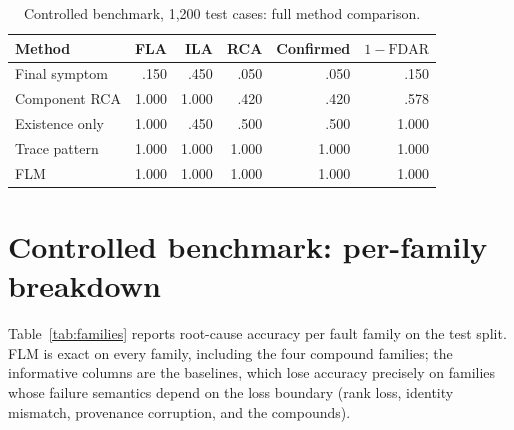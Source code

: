 \documentclass[10pt]{article}
\begin{document}
\begin{table}[h]
\centering
\caption{Controlled benchmark, 1,200 test cases: full method comparison.}
\label{tab:synthetic}
\begin{tabular}{lrrrrr}
\toprule
Method & FLA & ILA & RCA & Confirmed & $1-\mathrm{FDAR}$ \\
\midrule
Final symptom & .150 & .450 & .050 & .050 & .150 \\
Component RCA & 1.000 & 1.000 & .420 & .420 & .578 \\
Existence only & 1.000 & .450 & .500 & .500 & 1.000 \\
Trace pattern & 1.000 & 1.000 & 1.000 & 1.000 & 1.000 \\
FLM & 1.000 & 1.000 & 1.000 & 1.000 & 1.000 \\
\bottomrule
\end{tabular}
\end{table}

\section{Controlled benchmark: per-family breakdown}
\label{app:families}

Table~\ref{tab:families} reports root-cause accuracy per fault family on the test split. FLM is exact on every family, including the four compound families; the informative columns are the baselines, which lose accuracy precisely on families whose failure semantics depend on the loss boundary (rank loss, identity mismatch, provenance corruption, and the compounds).
\end{document}
